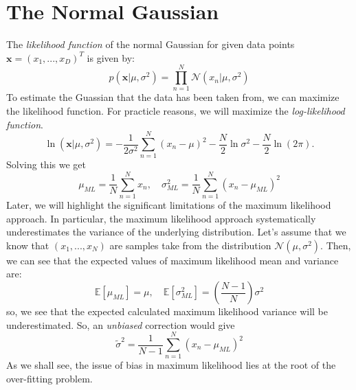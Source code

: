 \documentclass[11pt]{article}
\begin{document}
\section{The Normal Gaussian}
The \textit{likelihood function} of the normal Gaussian for given data points
$\textbf{x} = (x_1, ..., x_D)^T$ is given by:
\[p(\textbf{x}|\mu, \sigma^2) = \prod_{n=1}^N \mathcal{N}(x_n | \mu, \sigma^2)
\]
To estimate the Guassian that the data has been taken from, we can maximize
the likelihood function. For practicle reasons, we will maximize the
\textit{log-likelihood function}.
\begin{equation*}
  \ln(\textbf{x}|\mu, \sigma^2) = -\frac{1}{2\sigma^2} \sum_{n=1}^N
  (x_n - \mu)^2 - \frac{N}{2} \ln \sigma^2 - \frac{N}{2}\ln(2\pi).
\end{equation*}
Solving this we get
\begin{equation*}
  \mu_{ML} = \frac{1}{N}\sum_{n=1}^N x_n, \quad
  \sigma_{ML}^2 = \frac{1}{N} \sum_{n=1}^N (x_n - \mu_{ML})^2
\end{equation*}
Later, we will highlight the significant limitations of the maximum likelihood
approach. In particular, the maximum likelihood approach systematically
underestimates the variance of the underlying distribution. Let's assume that
we know that $(x_1, ..., x_N)$ are samples take from the distribution
$\mathcal{N}(\mu, \sigma^2)$. Then, we can see that the expected values of
maximum likelihood mean and variance are:
\begin{equation*}
  \mathbb{E}[\mu_{ML}] = \mu, \quad
  \mathbb{E}[\sigma_{ML}^2] = \left(\frac{N-1}{N}\right)\sigma^2
\end{equation*}
so, we see that the expected calculated maximum likelihood variance will be
underestimated. So, an \textit{unbiased} correction would give
\begin{equation*}
  \tilde{\sigma}^2 = \frac{1}{N-1} \sum_{n=1}^N (x_n - \mu_{ML})^2
\end{equation*}
As we shall see, the issue of bias in maximum likelihood lies at the root of
the over-fitting problem.
\end{document}
